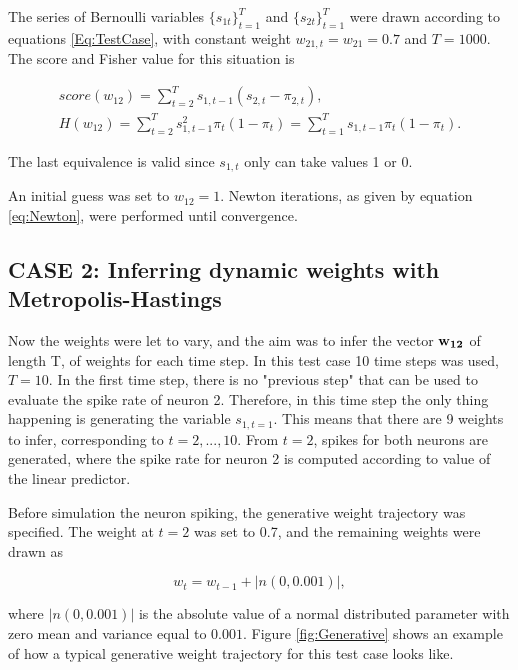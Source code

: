 The series of Bernoulli variables $\{s_{1t}\}_{t=1}^T$ and $\{s_{2t}\}_{t=1}^T$ were drawn according to equations \ref{Eq:TestCase}, with constant weight $w_{21,t} = w_{21} = 0.7$ and $T=1000$. The score and Fisher value for this situation is 

\begin{equation}
\begin{split}
    score(w_{12}) = \sum_{t=2}^{T} s_{1, t-1} (s_{2,t}-\pi_{2,t}), \\
    H(w_{12}) = \sum_{t=2}^T s_{1, t-1}^2 \pi_t(1-\pi_t) = \sum_{t=1}^T s_{1, t-1} \pi_t(1-\pi_t).
\end{split}
\end{equation}

The last equivalence is valid since $s_{1,t}$ only can take values 1 or 0. 

An initial guess was set to $w_{12} = 1$. Newton iterations, as given by equation \ref{eq:Newton}, were performed until convergence.\\ 

\subsection{CASE 2: Inferring dynamic weights with Metropolis-Hastings}
Now the weights were let to vary, and the aim was to infer the vector ${\bf w_{12}}$ of length T, of weights for each time step. In this test case 10 time steps was used, $T=10$. In the first time step, there is no "previous step" that can be used to evaluate the spike rate of neuron 2. Therefore, in this time step the only thing happening is generating the variable $s_{1,t=1}$. This means that there are 9 weights to infer, corresponding to $t=2,...,10$. From $t=2$, spikes for both neurons are generated, where the spike rate for neuron 2 is computed according to value of the linear predictor. 

Before simulation the neuron spiking, the generative weight trajectory was specified. The weight at $t=2$ was set to 0.7, and the remaining weights were drawn as

\begin{equation}
    w_{t} = w_{t-1} + |n(0,0.001)|,
\end{equation}

where $|n(0,0.001)|$ is the absolute value of a normal distributed parameter with zero mean and variance equal to $0.001$. Figure \ref{fig:Generative} shows an example of how a typical generative weight trajectory for this test case looks like. 

